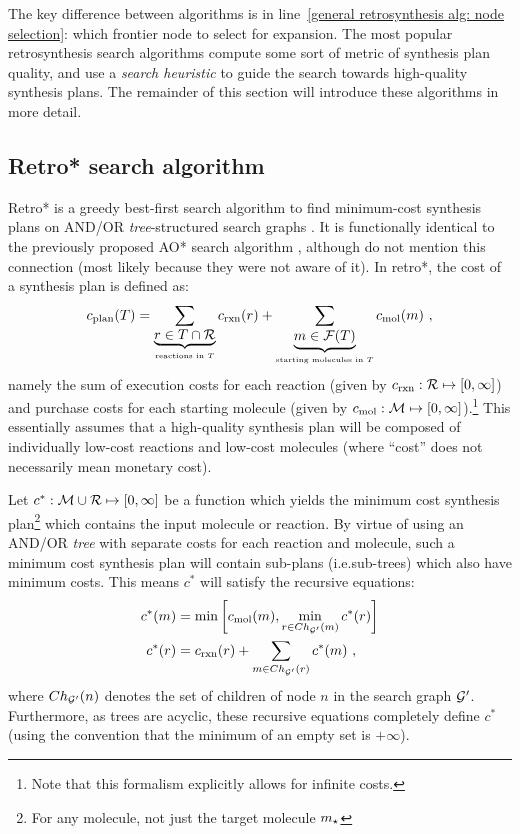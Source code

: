 The key difference between algorithms is in line~\ref{general retrosynthesis alg: node selection}:
which frontier node to select for expansion.
The most popular retrosynthesis search algorithms compute some sort of metric
of synthesis plan quality, and use a 
\emph{search heuristic} to guide the search towards high-quality synthesis plans.
The remainder of this section will introduce these algorithms in more detail.


\subsection{Retro* search algorithm}
\label{sec:background:retro*}

Retro* is a greedy best-first search algorithm to find minimum-cost synthesis plans
on AND/OR \emph{tree}-structured search graphs
\citep{chen2020retro}.
It is functionally identical to the previously proposed AO* search algorithm
\citep{chang1971admissible,martelli1978optimizing,nilsson1982principles,mahanti1985andor},
although \citet{chen2020retro} do not mention this connection (most likely because they were not aware of it).
In retro*, the cost of a synthesis plan is defined as:
\begin{equation}
    c_{\text{plan}}(T) = \sum_{
        \underbrace{r\in T\cap \mathcal{R}}_{\text{reactions in }T}
        } c_{\text{rxn}}(r) 
    + \sum_{
        \underbrace{m\in \mathcal{F}(T)}_{\text{starting molecules in }T}
        } c_{\text{mol}}(m)
    \ ,
\end{equation}
namely the sum of execution costs
for each reaction
(given by $c_{\text{rxn}}:\mathcal{R}\mapsto[0, \infty]$)
and purchase costs for each starting molecule
(given by $c_{\text{mol}}:\mathcal{M}\mapsto[0,\infty]$).\footnote{
    Note that this formalism explicitly allows for infinite costs.
}
This essentially assumes that a high-quality synthesis plan will be composed
of individually low-cost reactions
and low-cost molecules (where ``cost'' does not necessarily mean monetary cost).

Let $c^*:\mathcal{M}\cup\mathcal{R}\mapsto[0,\infty]$ be a function which yields
the minimum cost synthesis plan\footnote{For any molecule, not just the target molecule $m_\star$}
which contains the input molecule or reaction.
By virtue of using an AND/OR \emph{tree} with separate costs for each reaction and molecule,
such a minimum cost synthesis plan will contain sub-plans (i.e.\@ sub-trees)
which also have minimum costs.
This means $c^*$ will satisfy the recursive equations:
\begin{align}
    c^*(m) &= \min\left[
        c_{\text{mol}}(m),
        \min_{r\in Ch_{{\mathcal{G}}'}(m)} c^*(r)
    \right] \label{eqn:retro* min cost mol} \\
    c^*(r) &= c_{\text{rxn}}(r) + \sum_{m\in Ch_{{\mathcal{G}}'}(r)} c^*(m) \label{eqn:retro* min cost rxn} \ ,
\end{align}
where $Ch_{{\mathcal{G}}'}(n)$ denotes the set of children of node $n$ in the search graph ${\mathcal{G}}'$.
Furthermore, as trees are acyclic, these recursive equations completely define $c^*$
(using the convention that the minimum of an empty set is $+\infty$).

